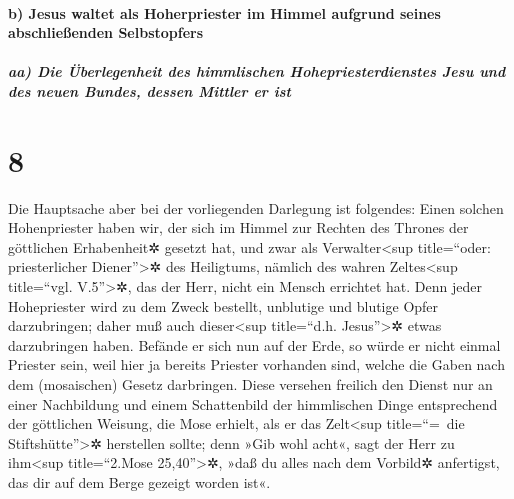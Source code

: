 \hypertarget{b-jesus-waltet-als-hoherpriester-im-himmel-aufgrund-seines-abschlieuxdfenden-selbstopfers}{%
\paragraph{b) Jesus waltet als Hoherpriester im Himmel aufgrund seines
abschließenden
Selbstopfers}\label{b-jesus-waltet-als-hoherpriester-im-himmel-aufgrund-seines-abschlieuxdfenden-selbstopfers}}

\hypertarget{aa-die-uxfcberlegenheit-des-himmlischen-hohepriesterdienstes-jesu-und-des-neuen-bundes-dessen-mittler-er-ist}{%
\subparagraph{aa) Die Überlegenheit des himmlischen Hohepriesterdienstes
Jesu und des neuen Bundes, dessen Mittler er
ist}\label{aa-die-uxfcberlegenheit-des-himmlischen-hohepriesterdienstes-jesu-und-des-neuen-bundes-dessen-mittler-er-ist}}

\hypertarget{section-7}{%
\section{8}\label{section-7}}

 Die Hauptsache aber bei der vorliegenden Darlegung ist
folgendes: Einen solchen Hohenpriester haben wir, der sich im Himmel zur
Rechten des Thrones der göttlichen Erhabenheit✲ gesetzt hat,
 und zwar als Verwalter\textless sup title=``oder:
priesterlicher Diener''\textgreater✲ des Heiligtums, nämlich des wahren
Zeltes\textless sup title=``vgl. V.5''\textgreater✲, das der Herr, nicht
ein Mensch errichtet hat.  Denn jeder Hohepriester wird zu
dem Zweck bestellt, unblutige und blutige Opfer darzubringen; daher muß
auch dieser\textless sup title=``d.h. Jesus''\textgreater✲ etwas
darzubringen haben.  Befände er sich nun auf der Erde, so
würde er nicht einmal Priester sein, weil hier ja bereits Priester
vorhanden sind, welche die Gaben nach dem (mosaischen) Gesetz
darbringen.  Diese versehen freilich den Dienst nur an
einer Nachbildung und einem Schattenbild der himmlischen Dinge
entsprechend der göttlichen Weisung, die Mose erhielt, als er das
Zelt\textless sup title=``=~die Stiftshütte''\textgreater✲ herstellen
sollte; denn »Gib wohl acht«, sagt der Herr zu ihm\textless sup
title=``2.Mose 25,40''\textgreater✲, »daß du alles nach dem Vorbild✲
anfertigst, das dir auf dem Berge gezeigt worden ist«.

